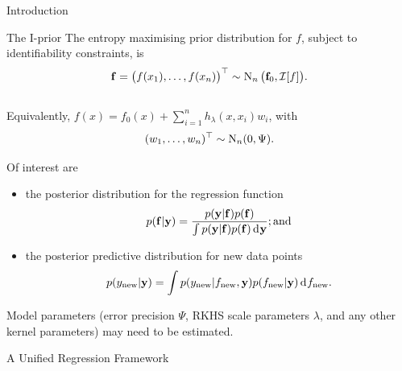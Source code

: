 \documentclass{beamer}
\newlength{\onecolwid}
\newlength{\threecolwid}
\begin{document}
\begin{frame}[t]
\begin{columns}[t]
\begin{column}{\threecolwid}
\begin{columns}[t,totalwidth=\threecolwid]
\begin{column}{\onecolwid}
\begin{block}{Introduction}
\begin{alertblock}{The I-prior}
\vspace{3pt}
The entropy maximising prior distribution for $f$, subject to identifiability constraints, is 
~\\[-13pt]
\[
  {\mathbf f} = \big(f(x_1),\dots,f(x_n) \big)^\top \sim \operatorname{N}_n \big({\mathbf f}_0, {\mathcal I}[f] \big).
\]
~\\[-18pt]
Equivalently, $f(x) = f_0(x) + \sum_{i=1}^n h_\lambda(x,x_i)w_i$, with
~\\[-13pt]
\[
  (w_1, \dots, w_n)^\top \sim \operatorname{N}_n(0,\Psi).
\]
\vspace{-11pt}

\end{alertblock}

\vspace{-10pt}
Of interest are 

\newcommand{\new}{{\text{new}}}
\begin{itemize}
  \item the posterior distribution for the regression function
  \vspace{-10pt}
  \[
    p({\mathbf f}|{\mathbf y}) = \frac{p({\mathbf y}|{\mathbf f}) p({\mathbf f})}{\int p({\mathbf y}|{\mathbf f}) p({\mathbf f}) \operatorname{d\!\:\!} {\mathbf y}}; \text{and}
  \]
  \vspace{-16pt}
  \item the posterior predictive distribution for new data points
  \[
    p(y_\new|\by) = \int p(y_\new|f_\new,\by) p(f_\new|\by) \d f_\new.
  \]
\end{itemize}
\vspace{5pt}
Model parameters (error precision $\Psi$, RKHS scale parameters $\lambda$, and any other kernel parameters) may need to be estimated.

\end{block}

\begin{block}{A Unified Regression Framework}


\end{block}
\end{column}
\end{columns}
\end{column}
\end{columns}
\end{frame}
\end{document}
